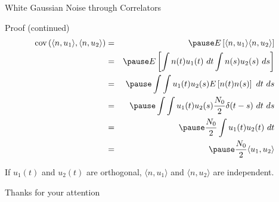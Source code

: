 \documentclass[t]{beamer}
\begin{document}
\begin{frame}{White Gaussian Noise through Correlators}
  \footnotesize
  \begin{block}{Proof (continued)}
      \begin{eqnarray*}
        \text{cov}\left( \langle n, u_1 \rangle, \langle n, u_2 \rangle \right) & = & \pause E\left[ \langle n, u_1 \rangle \langle n, u_2 \rangle \right] \\
        & = & \pause E \left[ \int n(t) u_1(t) \ dt \int n(s) u_2(s) \ ds \right] \\
        & = & \pause \int \int u_1(t) u_2(s) E\left[ n(t) n(s) \right] \ dt \ ds \\
        & = & \pause \int \int u_1(t) u_2(s) \frac{N_0}{2} \delta(t-s) \ dt \ ds \\
        & = & \pause \frac{N_0}{2} \int u_1(t) u_2(t) \ dt \\
        & = & \pause \frac{N_0}{2} \langle u_1, u_2 \rangle
      \end{eqnarray*}
  \end{block}
  If $u_1(t)$ and $u_2(t)$ are orthogonal, \pause $\langle n, u_1 \rangle$ and $\langle n, u_2 \rangle$ are independent.
  \normalsize
\end{frame}


\begin{frame}{}
\vfill
\begin{center}
Thanks for your attention
\end{center}
\vfill
\end{frame}
\end{document}
